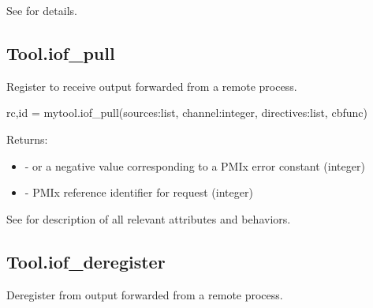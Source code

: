 See  for details.


\subsection{Tool.iof_pull}

\summary

Register to receive output forwarded from a remote process.

\format

\pyspecificstart
\begin{codepar}
rc,id = mytool.iof_pull(sources:list, channel:integer,
                        directives:list, cbfunc)
\end{codepar}
\pyspecificend

\begin{arglist}
\end{arglist}

Returns:

\begin{itemize}
    \item {} -  or a negative value corresponding to a PMIx error constant (integer)
    \item {} - \ac{PMIx} reference identifier for request (integer)
\end{itemize}

See  for description of all relevant attributes and behaviors.


\subsection{Tool.iof_deregister}

\summary

Deregister from output forwarded from a remote process.

\format

